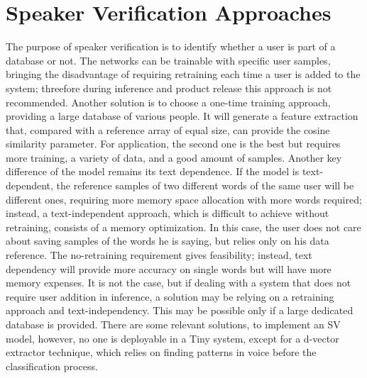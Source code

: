 \section{Speaker Verification Approaches}
\label{subsec:sv approaches}
The purpose of speaker verification is to identify whether a user is part of a database or not. The networks can be trainable with specific user samples, bringing the disadvantage of requiring retraining each time a user is added to the system; threefore during inference and product release this approach is not recommended. Another solution is to choose a one-time training approach, providing a large database of various people. It will generate a feature extraction that, compared with a reference array of equal size, can provide the cosine similarity parameter. For application, the second one is the best but requires more training, a variety of data, and a good amount of samples. Another key difference of the model remains its text dependence. If the model is text-dependent, the reference samples of two different words of the same user will be different ones, requiring more memory space allocation with more words required; instead, a text-independent approach, which is difficult to achieve without retraining, consists of a memory optimization. In this case, the user does not care about saving samples of the words he is saying, but relies only on his data reference. The no-retraining requirement gives feasibility; instead, text dependency will provide more accuracy on single words but will have more memory expenses. It is not the case, but if dealing with a system that does not require user addition in inference, a solution may be relying on a retraining approach and text-independency. This may be possible only if a large dedicated database is provided. There are some relevant solutions, to implement an SV model, however, no one is deployable in a Tiny system, except for a d-vector extractor technique, which relies on finding patterns in voice before the classification process\cite{dvector_extractor_TinySV}.\newline 

